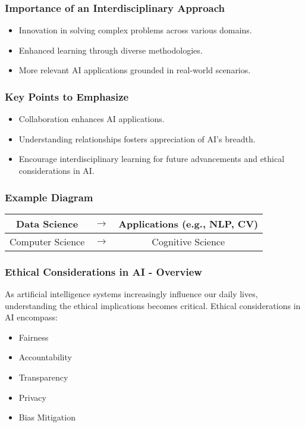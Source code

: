 \documentclass[aspectratio=169]{beamer}
\begin{document}
\begin{frame}[fragile]
    \frametitle{Importance of an Interdisciplinary Approach}
    \begin{itemize}
        \item Innovation in solving complex problems across various domains.
        \item Enhanced learning through diverse methodologies.
        \item More relevant AI applications grounded in real-world scenarios.
    \end{itemize}
\end{frame}

\begin{frame}[fragile]
    \frametitle{Key Points to Emphasize}
    \begin{itemize}
        \item Collaboration enhances AI applications.
        \item Understanding relationships fosters appreciation of AI's breadth.
        \item Encourage interdisciplinary learning for future advancements and ethical considerations in AI.
    \end{itemize}
\end{frame}

\begin{frame}[fragile]
    \frametitle{Example Diagram}
    \begin{center}
    \begin{tabular}{|c|c|c|}
    \hline
    Data Science & $\rightarrow$ & Applications (e.g., NLP, CV) \\
    \hline
    Computer Science & $\rightarrow$ & Cognitive Science \\
    \hline
    \end{tabular}
    \end{center}
\end{frame}

\begin{frame}[fragile]
  \frametitle{Ethical Considerations in AI - Overview}
  As artificial intelligence systems increasingly influence our daily lives, understanding the ethical implications becomes critical. Ethical considerations in AI encompass:
  \begin{itemize}
    \item Fairness
    \item Accountability
    \item Transparency
    \item Privacy
    \item Bias Mitigation
  \end{itemize}
\end{frame}
\end{document}
